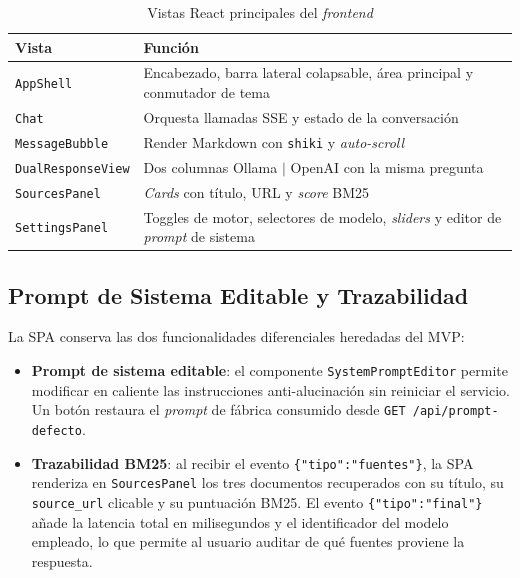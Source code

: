 \documentclass[conference]{IEEEtran}
\newcommand{\code}[1]{\texttt{\small #1}}
\begin{document}
\begin{table}[ht]
\centering
\caption{Vistas React principales del \textit{frontend}}
\label{tab:ui}
\setlength{\tabcolsep}{4pt}
\begin{tabular}{@{}lp{}@{}}
\toprule
\textbf{Vista}           & \textbf{Función} \\
\midrule
\code{AppShell}          & Encabezado, barra lateral colapsable, área principal y conmutador de tema \\
\code{Chat}              & Orquesta llamadas SSE y estado de la conversación \\
\code{MessageBubble}     & Render Markdown con \code{shiki} y \textit{auto-scroll} \\
\code{DualResponseView}  & Dos columnas Ollama $\mid$ OpenAI con la misma pregunta \\
\code{SourcesPanel}      & \textit{Cards} con título, URL y \textit{score} BM25 \\
\code{SettingsPanel}     & Toggles de motor, selectores de modelo, \textit{sliders} y editor de \textit{prompt} de sistema \\
\bottomrule
\end{tabular}
\end{table}

\subsection{Prompt de Sistema Editable y Trazabilidad}

La SPA conserva las dos funcionalidades diferenciales heredadas del MVP:

\begin{itemize}
    \item \textbf{Prompt de sistema editable}: el componente
          \code{SystemPromptEditor} permite modificar en caliente las
          instrucciones anti-alucinación sin reiniciar el servicio. Un
          botón restaura el \textit{prompt} de fábrica consumido desde
          \code{GET /api/prompt-defecto}.
    \item \textbf{Trazabilidad BM25}: al recibir el evento
          \code{\{"tipo":"fuentes"\}}, la SPA renderiza en
          \code{SourcesPanel} los tres documentos recuperados con su
          título, su \code{source\_url} clicable y su puntuación BM25. El
          evento \code{\{"tipo":"final"\}} añade la latencia total en
          milisegundos y el identificador del modelo empleado, lo que
          permite al usuario auditar de qué fuentes proviene la
          respuesta.
\end{itemize}
\end{document}
